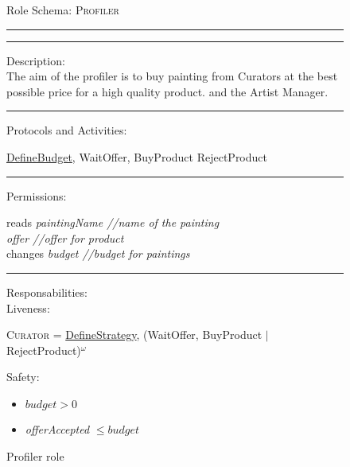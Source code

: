 \documentclass[a4paper,11pt]{report}
\begin{document}
  \begin{figure}[ht!]
    \begin{mdframed}
      Role Schema: \textsc{Profiler} \\ \hrule \vspace{2pt} \hrule \vspace{10pt}
      Description:\\
      The aim of the profiler is to buy painting from Curators at the best possible
      price for a high quality product.
      and the Artist Manager.
      \\ \hrule \vspace{10pt}
      Protocols and Activities:
      \vspace{-10pt}
      \begin{flushleft}
       \underline{DefineBudget}, WaitOffer, BuyProduct
       RejectProduct
      \end{flushleft}
      \hrule \vspace{10pt}
      Permissions:\\
      \vspace{-10pt}
      \begin{center}
       reads \textit{paintingName //name of the painting}\\
	    \textit{offer //offer for product}\\
      changes \textit{budget //budget for paintings}
      \end{center}
      \hrule \vspace{10pt}
      Responsabilities:\\
      Liveness:
      \vspace{-10pt}
      \begin{flushleft}
      \small\textsc{Curator} = \underline{DefineStrategy}, (WaitOffer, BuyProduct $\mid$
      RejectProduct)$^\omega$
      \end{flushleft}
      Safety:
      \vspace{-10pt}
      \begin{itemize}
      \item $budget > 0$
       \item \textit{offerAccepted} $\leq budget$
      \end{itemize}
    \end{mdframed}
  \caption{Profiler role}
  \label{figure:role_profiler}
  \end{figure}
  
\end{document}
